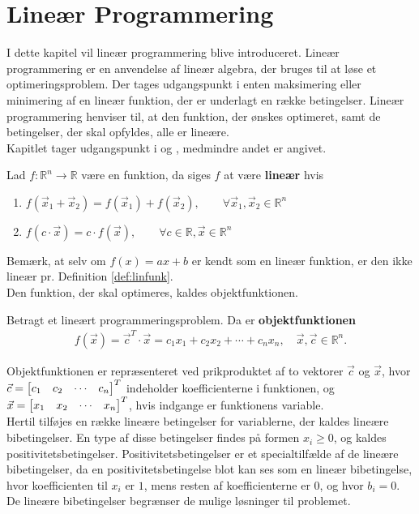 \chapter{Lineær Programmering}
I dette kapitel vil lineær programmering blive introduceret.
Lineær programmering er en anvendelse af lineær algebra, der bruges til at løse et optimeringsproblem. Der tages udgangspunkt i enten maksimering eller minimering af en lineær funktion, der er underlagt en række betingelser. 
Lineær programmering henviser til, at den funktion, der ønskes optimeret, samt de betingelser, der skal opfyldes, alle er lineære. \\
Kapitlet tager udgangspunkt i \citep{bert} og \citep{lay}, medmindre andet er angivet. 

\begin{defn}
Lad $f:\mathds{R}^n \to \mathds{R}$ være en funktion, da siges $f$ at være \textbf{lineær} hvis
\begin{enumerate}[label=\alph*]
\item $f(\vec{x}_1 + \vec{x}_2) = f(\vec{x}_1) + f(\vec{x}_2), \qquad \forall \vec{x}_1,\vec{x}_2\in \mathds{R}^n$
\item $f(c\cdot \vec{x}) = c \cdot f(\vec{x}), \qquad \forall c \in \mathds{R}, \vec{x} \in \mathds{R}^n$
\end{enumerate}
\label{def:linfunk}
\end{defn}

Bemærk, at selv om $f(x) = ax + b$ er kendt som en lineær funktion, er den ikke lineær pr. Definition \ref{def:linfunk}.\\
Den funktion, der skal optimeres, kaldes objektfunktionen.
\begin{defn}
Betragt et lineært programmeringsproblem. Da er \textbf{objektfunktionen}
\begin{align*}
f(\vec{x}) = \vec{c}^T \cdot \vec{x} = c_1x_1 + c_2x_2 + \cdots + c_nx_n, \quad  \vec{x}, \vec{c} \in \mathds{R}^n. 
\end{align*}
\end{defn}

Objektfunktionen er repræsenteret ved prikproduktet af to vektorer $\vec{c}$ og $\vec{x}$, hvor \\
$\vec{c}= \begin{bmatrix} c_1 & c_2 & \cdots & c_n \end{bmatrix}^T$ indeholder koefficienterne i funktionen, og $\vec{x}= \begin{bmatrix} x_1 & x_2 & \cdots & x_n \end{bmatrix}^T$, hvis indgange er funktionens variable. \\
Hertil tilføjes en række lineære betingelser for variablerne, der kaldes lineære bibetingelser. 
En type af disse betingelser findes på formen $x_i \geq 0$, og kaldes positivitetsbetingelser. Positivitetsbetingelser er et specialtilfælde af de lineære bibetingelser, da en positivitetsbetingelse blot kan ses som en lineær bibetingelse, hvor koefficienten til $x_i$ er $1$, mens resten af koefficienterne er $0$, og hvor $b_i=0$. \\
De lineære bibetingelser begrænser de mulige løsninger til problemet.

